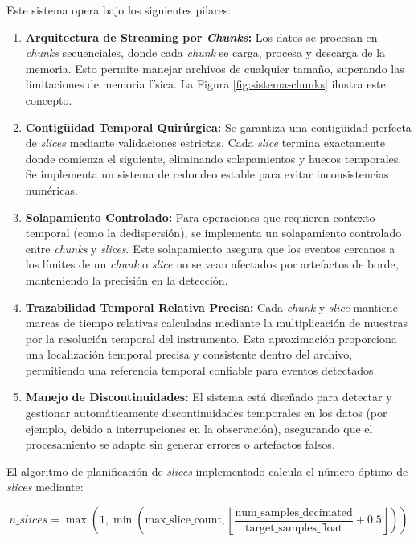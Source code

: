 Este sistema opera bajo los siguientes pilares:
\begin{enumerate}
    \item \textbf{Arquitectura de Streaming por \emph{Chunks}:} Los datos se procesan en \emph{chunks} secuenciales, donde cada \emph{chunk} se carga, procesa y descarga de la memoria. Esto permite manejar archivos de cualquier tamaño, superando las limitaciones de memoria física. La Figura \ref{fig:sistema-chunks} ilustra este concepto.
    \item \textbf{Contigüidad Temporal Quirúrgica:} Se garantiza una contigüidad perfecta de \emph{slices} mediante validaciones estrictas. Cada \emph{slice} termina exactamente donde comienza el siguiente, eliminando solapamientos y huecos temporales. Se implementa un sistema de redondeo estable para evitar inconsistencias numéricas.
    \item \textbf{Solapamiento Controlado:} Para operaciones que requieren contexto temporal (como la dedispersión), se implementa un solapamiento controlado entre \emph{chunks} y \emph{slices}. Este solapamiento asegura que los eventos cercanos a los límites de un \emph{chunk} o \emph{slice} no se vean afectados por artefactos de borde, manteniendo la precisión en la detección.
    \item \textbf{Trazabilidad Temporal Relativa Precisa:} Cada \emph{chunk} y \emph{slice} mantiene marcas de tiempo relativas calculadas mediante la multiplicación de muestras por la resolución temporal del instrumento. Esta aproximación proporciona una localización temporal precisa y consistente dentro del archivo, permitiendo una referencia temporal confiable para eventos detectados.
    \item \textbf{Manejo de Discontinuidades:} El sistema está diseñado para detectar y gestionar automáticamente discontinuidades temporales en los datos (por ejemplo, debido a interrupciones en la observación), asegurando que el procesamiento se adapte sin generar errores o artefactos falsos.
\end{enumerate}

El algoritmo de planificación de \emph{slices} implementado calcula el número óptimo de \emph{slices} mediante:

\[
n\_slices = \max\left(1, \min\left(\text{max\_slice\_count}, \left\lfloor\frac{\text{num\_samples\_decimated}}{\text{target\_samples\_float}} + 0.5\right\rfloor\right)\right)
\]


